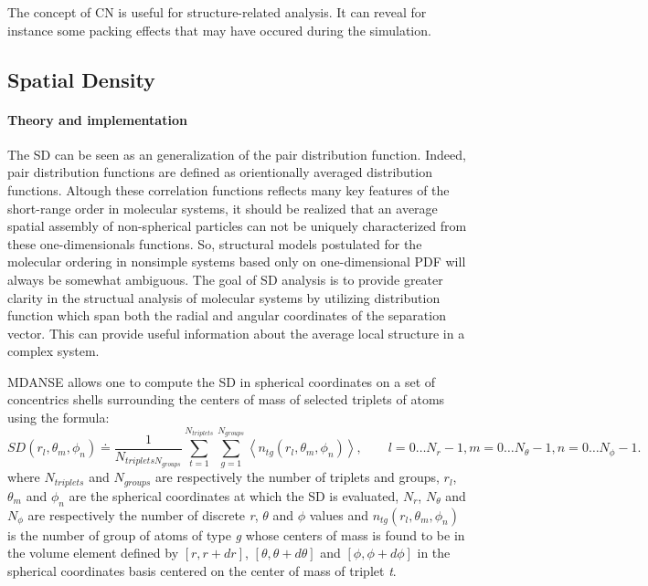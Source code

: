 \documentclass[a4paper,11pt]{article}
\begin{document}
The concept of \gls{CN} is useful for structure-related analysis. It can reveal for instance some packing effects that may have
occured during the simulation.

\subsection{Spatial Density}
\label{sd}
\paragraph{Theory and implementation\\}
\label{sd_theory}
The \gls{SD} can be seen as an generalization of the pair distribution function. Indeed, pair distribution functions are defined
as orientionally averaged distribution functions. Altough these correlation functions reflects many
key features of the short-range order in molecular systems, it should be realized that an average spatial assembly of
non-spherical particles can not be uniquely characterized from these one-dimensionals functions. So, structural models
postulated for the molecular ordering in nonsimple systems based only on one-dimensional \gls{PDF} will always be somewhat
ambiguous. The goal of \gls{SD} analysis is to provide greater clarity in the structual analysis of molecular systems by utilizing
distribution function which span both the radial and angular coordinates of the separation vector. This can provide useful
information about the average local structure in a complex system.

\gls{MDANSE} allows one to compute the \gls{SD} in spherical coordinates on a set of concentrics shells surrounding the centers of
mass of selected triplets of atoms using the formula:
\begin{equation}
\label{eq:sd}
SD(r_l,\theta_m ,\phi_n) \doteq \frac{1}{N_{triplets N_{groups}}}\sum\limits_{t = 1}^{N_{triplets}}\sum\limits_{g = 1}^{N_{groups}} \left\langle n_{tg}(r_l,\theta_m,\phi_n)\right\rangle,
\qquad l = 0\ldots N_r - 1, m = 0\ldots N_{\theta} - 1, n = 0\ldots N_{\phi} - 1.
\end{equation}
where $N_{triplets}$ and $N_{groups}$ are respectively the number of triplets and groups, $r_l$, $\theta_m$ and $\phi_n$ are the spherical coordinates at which the \gls{SD} is evaluated,
$N_r$, $N_{\theta}$ and $N_{\phi}$ are respectively the number of discrete \textit{r}, $\theta$ and $\phi$ values and
$n_{tg}(r_l,\theta_m,\phi_n)$ is the number of group of atoms of type \textit{g} whose centers of mass is found
to be in the volume element defined by $[r, r+dr]$, $[\theta , \theta + d\theta]$ and $[\phi , \phi + d\phi]$ in the
spherical coordinates basis centered on the center of mass of triplet \textit{t}.
\end{document}
